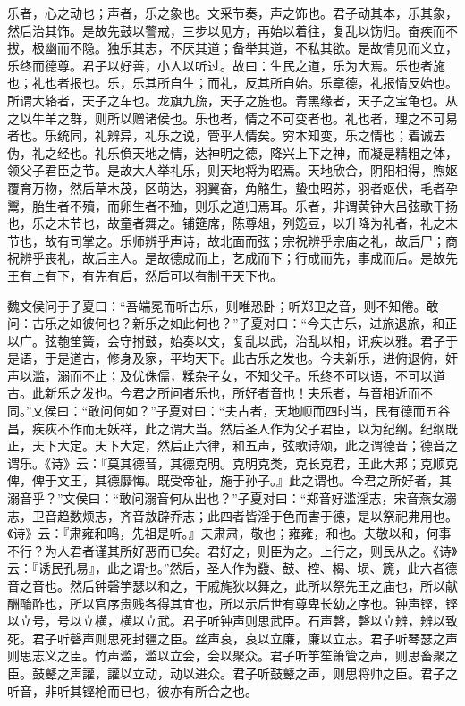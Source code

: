 \documentclass[]{article}
\begin{document}
乐者，心之动也；声者，乐之象也。文采节奏，声之饰也。君子动其本，乐其象，然后治其饰。是故先鼓以警戒，三步以见方，再始以着往，复乱以饬归。奋疾而不拔，极幽而不隐。独乐其志，不厌其道；备举其道，不私其欲。是故情见而义立，乐终而德尊。君子以好善，小人以听过。故曰：生民之道，乐为大焉。乐也者施也；礼也者报也。乐，乐其所自生；而礼，反其所自始。乐章德，礼报情反始也。所谓大辂者，天子之车也。龙旗九旒，天子之旌也。青黑缘者，天子之宝龟也。从之以牛羊之群，则所以赠诸侯也。乐也者，情之不可变者也。礼也者，理之不可易者也。乐统同，礼辨异，礼乐之说，管乎人情矣。穷本知变，乐之情也；着诚去伪，礼之经也。礼乐偩天地之情，达神明之德，降兴上下之神，而凝是精粗之体，领父子君臣之节。是故大人举礼乐，则天地将为昭焉。天地欣合，阴阳相得，煦妪覆育万物，然后草木茂，区萌达，羽翼奋，角觡生，蛰虫昭苏，羽者妪伏，毛者孕鬻，胎生者不殰，而卵生者不殈，则乐之道归焉耳。乐者，非谓黄钟大吕弦歌干扬也，乐之末节也，故童者舞之。铺筵席，陈尊俎，列笾豆，以升降为礼者，礼之末节也，故有司掌之。乐师辨乎声诗，故北面而弦；宗祝辨乎宗庙之礼，故后尸；商祝辨乎丧礼，故后主人。是故德成而上，艺成而下；行成而先，事成而后。是故先王有上有下，有先有后，然后可以有制于天下也。

魏文侯问于子夏曰：``吾端冕而听古乐，则唯恐卧；听郑卫之音，则不知倦。敢问：古乐之如彼何也？新乐之如此何也？''子夏对曰：``今夫古乐，进旅退旅，和正以广。弦匏笙簧，会守拊鼓，始奏以文，复乱以武，治乱以相，讯疾以雅。君子于是语，于是道古，修身及家，平均天下。此古乐之发也。今夫新乐，进俯退俯，奸声以滥，溺而不止；及优侏儒，糅杂子女，不知父子。乐终不可以语，不可以道古。此新乐之发也。今君之所问者乐也，所好者音也！夫乐者，与音相近而不同。''文侯曰：``敢问何如？''子夏对曰：``夫古者，天地顺而四时当，民有德而五谷昌，疾疢不作而无妖祥，此之谓大当。然后圣人作为父子君臣，以为纪纲。纪纲既正，天下大定。天下大定，然后正六律，和五声，弦歌诗颂，此之谓德音；德音之谓乐。《诗》云：『莫其德音，其德克明。克明克类，克长克君，王此大邦；克顺克俾，俾于文王，其德靡悔。既受帝祉，施于孙子。』此之谓也。今君之所好者，其溺音乎？''文侯曰：``敢问溺音何从出也？''子夏对曰：``郑音好滥淫志，宋音燕女溺志，卫音趋数烦志，齐音敖辟乔志；此四者皆淫于色而害于德，是以祭祀弗用也。《诗》云：『肃雍和鸣，先祖是听。』夫肃肃，敬也；雍雍，和也。夫敬以和，何事不行？为人君者谨其所好恶而已矣。君好之，则臣为之。上行之，则民从之。《诗》云：『诱民孔易』，此之谓也。''然后，圣人作为鼗、鼓、椌、楬、埙、篪，此六者德音之音也。然后钟磬竽瑟以和之，干戚旄狄以舞之，此所以祭先王之庙也，所以献酬酳酢也，所以官序贵贱各得其宜也，所以示后世有尊卑长幼之序也。钟声铿，铿以立号，号以立横，横以立武。君子听钟声则思武臣。石声磬，磬以立辨，辨以致死。君子听磬声则思死封疆之臣。丝声哀，哀以立廉，廉以立志。君子听琴瑟之声则思志义之臣。竹声滥，滥以立会，会以聚众。君子听竽笙箫管之声，则思畜聚之臣。鼓鼙之声讙，讙以立动，动以进众。君子听鼓鼙之声，则思将帅之臣。君子之听音，非听其铿枪而已也，彼亦有所合之也。
\end{document}
